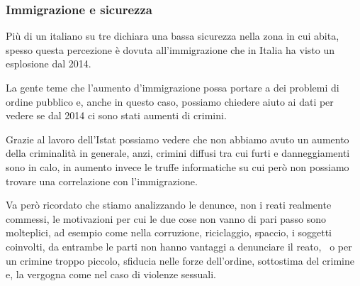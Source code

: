 \documentclass[12pt]{book} %
\begin{document}
\bigskip

\subsubsection{Immigrazione e sicurezza}
Più di un italiano su tre dichiara una bassa sicurezza nella zona in cui abita, spesso questa percezione è dovuta
all'immigrazione che in Italia ha visto un esplosione dal
2014.

La gente teme che l'aumento d'immigrazione possa portare a dei problemi di
ordine pubblico e, anche in questo caso, possiamo chiedere aiuto ai dati per vedere se dal 2014 ci sono stati aumenti
di crimini.

Grazie al lavoro dell'Istat possiamo vedere
che non abbiamo avuto un aumento della criminalità in generale, anzi, crimini diffusi tra cui furti e danneggiamenti
sono in calo, in aumento invece le truffe informatiche su cui però non possiamo trovare una correlazione con
l'immigrazione.

Va però ricordato che stiamo analizzando le denunce, non i reati realmente commessi, le motivazioni per cui le due cose
non vanno di pari passo sono molteplici, ad esempio come nella corruzione, riciclaggio, spaccio, i soggetti coinvolti,
da entrambe le parti non hanno vantaggi a denunciare il reato, \ o per un crimine troppo piccolo, sfiducia nelle forze
dell'ordine, sottostima del crimine e, la vergogna come nel caso di violenze sessuali.


\bigskip
\end{document}
